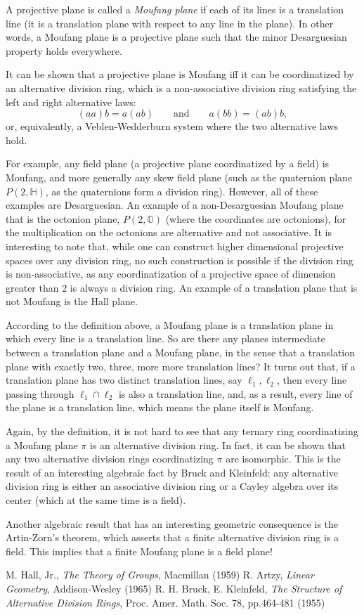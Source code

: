\documentclass[12pt]{article}
\begin{document}
A projective plane is called a \emph{Moufang plane} if each of its lines is a translation line (it is a translation plane with respect to any line in the plane).  In other words, a Moufang plane is a projective plane such that the minor Desarguesian property holds everywhere.

It can be shown that a projective plane is Moufang iff it can be coordinatized by an alternative division ring, which is a non-associative division ring satisfying the left and right alternative laws:
$$(aa)b=a(ab)\qquad \mbox{and} \qquad a(bb)=(ab)b,$$
or, equivalently, a Veblen-Wedderburn system where the two alternative laws hold.

For example, any field plane (a projective plane coordinatized by a field) is Moufang, and more generally any skew field plane (such as the quaternion plane $P(2,\mathbb{H})$, as the quaternions form a division ring).  However, all of these examples are Desarguesian.  An example of a non-Desarguesian Moufang plane that is the octonion plane, $P(2,\mathbb{O})$ (where the coordinates are octonions), for the multiplication on the octonions are alternative and not associative.  It is interesting to note that, while one can construct higher dimensional projective spaces over any division ring, no such construction is possible if the division ring is non-associative, as any coordinatization of a projective space of dimension greater than $2$ is always a division ring.  An example of a translation plane that is not Moufang is the Hall plane.

According to the definition above, a Moufang plane is a translation plane in which every line is a translation line.  So are there any planes intermediate between a translation plane and a Moufang plane, in the sense that a translation plane with exactly two, three, more more translation lines?  It turns out that, if a translation plane has two distinct translation lines, say $\ell_1, \ell_2$, then every line passing through $\ell_1\cap \ell_2$ is also a translation line, and, as a result, every line of the plane is a translation line, which means the plane itself is Moufang.

Again, by the definition, it is not hard to see that any ternary ring coordinatizing a Moufang plane $\pi$ is an alternative division ring.  In fact, it can be shown that any two alternative division rings coordinatizing $\pi$ are isomorphic.  This is the result of an interesting algebraic fact by Bruck and Kleinfeld: any alternative division ring is either an associative division ring or a Cayley algebra over its center (which at the same time is a field).  

Another algebraic result that has an interesting geometric consequence is the Artin-Zorn's theorem, which asserts that a finite alternative division ring is a field.  This implies that a finite Moufang plane is a field plane!

\begin{thebibliography}{7}
 M. Hall, Jr., {\it The Theory of Groups}, Macmillan (1959)
 R. Artzy, {\it Linear Geometry}, Addison-Wesley (1965)
 R. H. Bruck, E. Kleinfeld, {\it The Structure of Alternative Division Rings}, Proc. Amer. Math. Soc. 78, pp.464-481 (1955)
\end{thebibliography}
\end{document}
